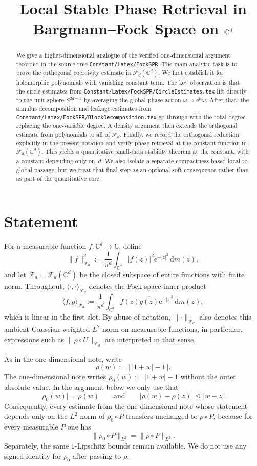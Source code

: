 \documentclass[11pt]{amsart}
\title{Local Stable Phase Retrieval in Bargmann--Fock Space on $\C^d$}
\author{}
\theoremstyle{remark}
\newcommand{\C}{\mathbb{C}}
\newcommand{\abs}[1]{\lvert #1 \rvert}
\newcommand{\norm}[1]{\lVert #1 \rVert}
\newcommand{\dd}{\mathrm{d}}
\newcommand{\ee}{\mathrm{e}}
\newcommand{\ii}{\mathrm{i}}
\newcommand{\rhoFn}{\rho}
\newcommand{\Fd}{\mathcal{F}_d}
\newcommand{\Sphere}{S^{2d-1}}
\begin{document}
\begin{abstract}
We give a higher-dimensional analogue of the verified one-dimensional
argument recorded in the source tree
\texttt{Constant/Latex/FockSPR}.  The main analytic task is to prove the
orthogonal coercivity estimate in $\Fd(\C^d)$.  We first establish it for
holomorphic polynomials with vanishing constant term.  The key observation
is that the circle estimates from
\texttt{Constant/Latex/FockSPR/CircleEstimates.tex} lift directly to the
unit sphere $\Sphere$ by averaging the global phase action
$\omega \mapsto \ee^{\ii t}\omega$.  After that, the annulus decomposition
and leakage estimates from
\texttt{Constant/Latex/FockSPR/BlockDecomposition.tex} go through with the
total degree replacing the one-variable degree.  A density argument then
extends the orthogonal estimate from polynomials to all of $\Fd$.  Finally,
we record the orthogonal reduction explicitly in the present notation and
verify phase retrieval at the constant function in $\Fd(\C^d)$.  This yields
a quantitative small-data stability theorem at the constant, with a
constant depending only on~$d$.  We also isolate a separate
compactness-based local-to-global passage, but we treat that final step as
an optional soft consequence rather than as part of the quantitative core.
\end{abstract}

\maketitle

\section{Statement}

For a measurable function $f \colon \C^d \to \C$, define
\[
\norm{f}_{\Fd}^2
:=
\frac{1}{\pi^d}\int_{\C^d} \abs{f(z)}^2 \ee^{-\abs{z}^2}\,\dd m(z),
\]
and let $\Fd = \Fd(\C^d)$ be the closed subspace of entire functions with
finite norm.
Throughout, $\langle \cdot,\cdot\rangle_{\Fd}$ denotes the Fock-space inner
product
\[
\langle f,g\rangle_{\Fd}
:=
\frac{1}{\pi^d}\int_{\C^d} f(z)\overline{g(z)} \ee^{-\abs{z}^2}\,\dd m(z),
\]
which is linear in the first slot.
By abuse of notation, $\norm{\cdot}_{\Fd}$ also denotes this ambient
Gaussian weighted $L^2$ norm on measurable functions; in particular,
expressions such as $\norm{\rhoFn \circ U}_{\Fd}$ are interpreted in that
sense.

As in the one-dimensional note, write
\[
\rhoFn(w) := \bigl\lvert\, \abs{1+w} - 1 \,\bigr\rvert.
\]
The one-dimensional note writes $\rho_0(w) := \abs{1+w}-1$ without the
outer absolute value.  In the argument below we only use that
\[
\abs{\rho_0(w)} = \rhoFn(w)
\qquad\text{and}\qquad
\abs{\rhoFn(w)-\rhoFn(z)} \le \abs{w-z}.
\]
Consequently, every estimate from the one-dimensional note whose statement
depends only on the $L^2$ norm of $\rho_0 \circ P$ transfers unchanged to
$\rhoFn \circ P$, because for every measurable $P$ one has
\[
\norm{\rho_0 \circ P}_{L^2} = \norm{\rhoFn \circ P}_{L^2}.
\]
Separately, the same $1$-Lipschitz bounds remain available.  We do not use
any signed identity for $\rho_0$ after passing to $\rhoFn$.
\end{document}
